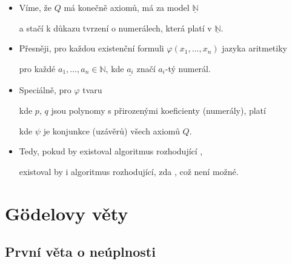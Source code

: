 \begin{itemize}
\item Víme, že  $Q$ má konečně axiomů, má za model $\underline{\mathbb{N}}$
\smallskip

a stačí k důkazu  tvrzení o numerálech, která platí v $\underline{\mathbb{N}}$.
\smallskip

\item Přesněji, pro každou existenční formuli $\varphi(x_1,\dots,x_n)$ jazyka aritmetiky



pro každé $a_1,\dots,a_n \in \mathbb{N}$, kde $\underline{a_i}$ značí $a_i$-tý numerál.
\smallskip

\item Speciálně, pro $\varphi$ tvaru 
\smallskip

kde $p$, $q$ jsou polynomy s přirozenými koeficienty (numerály), platí



kde $\psi$ je konjunkce (uzávěrů) všech axiomů $Q$.
\smallskip

\item Tedy, pokud by existoval algoritmus rozhodující ,
\smallskip

existoval by i algoritmus rozhodující, zda , což není možné.


\end{itemize}



\section{Gödelovy věty}\todo



\subsection{První věta o neúplnosti}\todo

